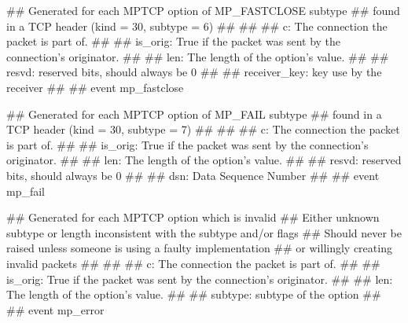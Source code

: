 \begin{code}

## Generated for each MPTCP option of MP_FASTCLOSE subtype
## found in a TCP header (kind = 30, subtype = 6) 
## 
##
## c: The connection the packet is part of.
##
## is_orig: True if the packet was sent by the connection's originator.
##
## len: The length of the option's value.
##
## resvd: reserved bits, should always be 0
##
## receiver_key: key use by the receiver
##
## 
event mp_fastclose%

\end{code}

\begin{code}


## Generated for each MPTCP option of MP_FAIL subtype
## found in a TCP header (kind = 30, subtype = 7) 
## 
##
## c: The connection the packet is part of.
##
## is_orig: True if the packet was sent by the connection's originator.
##
## len: The length of the option's value.
##
## resvd: reserved bits, should always be 0
##
## dsn: Data Sequence Number
##
## 
event mp_fail%

\end{code}

\begin{code}


## Generated for each MPTCP option which is invalid
## Either unknown subtype or length inconsistent with the subtype and/or flags 
## Should never be raised unless someone is using a faulty implementation
## or willingly creating invalid packets
## 
##
## c: The connection the packet is part of.
##
## is_orig: True if the packet was sent by the connection's originator.
##
## len: The length of the option's value.
##
## subtype: subtype of the option
##
## 
event mp_error%
\end{code}